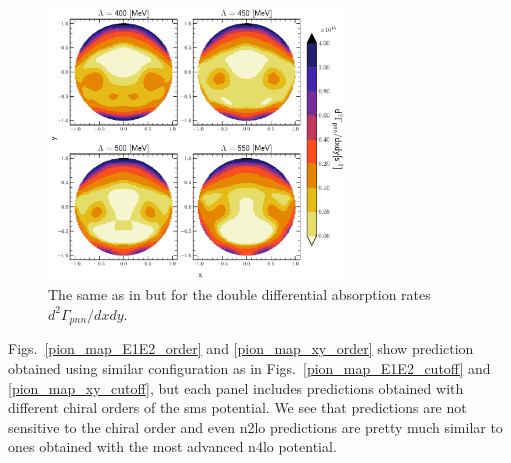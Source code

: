     \begin{figure}[h]
        \begin{center}
        \includegraphics[width=0.7\textwidth]{PlotData/PION/Dalitz_maps/figures/Dalitz_map_pnn_xy_cutofs_1NC.pdf}
        \end{center}
        \caption{The same as in  but for the double differential absorption rates
        $d^2 \Gamma_{pnn}/dxdy$.}
        \label{pion_map_xy_cutoff_1NC}
    \end{figure}

    Figs.~\ref{pion_map_E1E2_order} and \ref{pion_map_xy_order} show prediction obtained using similar configuration
    as in Figs.~\ref{pion_map_E1E2_cutoff} and \ref{pion_map_xy_cutoff}, but each panel includes
    predictions obtained with different chiral orders of the \gls{sms} potential.
    We see that predictions are not sensitive to the chiral order and even \gls{n2lo} predictions
    are pretty much similar to ones obtained with the most advanced \gls{n4lo} potential. 
    

